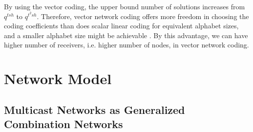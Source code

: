 \begin{rem}
By using the vector coding, the upper bound number of solutions increases
from $q^{tsh}$ to $q^{t^{2}sh}$. Therefore, vector network coding
offers more freedom in choosing the coding coefficients than does
scalar linear coding for equivalent alphabet sizes, and a smaller
alphabet size might be achievable \cite{Ebrahimi:2011}. By this advantage,
we can have higher number of receivers, i.e. higher number of nodes,
in vector network coding.
\end{rem}

\section{Network Model}

\subsection{Multicast Networks as Generalized Combination Networks}

